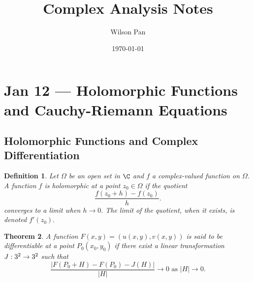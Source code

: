 \documentclass[a4paper]{article}
\title{Complex Analysis Notes}
\author{Wilson Pan}
\date{\today}
\newtheorem{thm}{Theorem}[section]
\newtheorem{defn}[thm]{Definition}
\begin{document}
\maketitle

\tableofcontents
\newpage

\section{Jan 12 --- Holomorphic Functions and Cauchy-Riemann Equations}
\subsection{Holomorphic Functions and Complex Differentiation}
\begin{defn}
    Let $\Omega$ be an open set in $\C$ and $f$ a complex-valued function on $\Omega$. A  function $f$ is holomorphic at a point $z_0\in \Omega$ if the quotient \[
    \frac{f(z_0+h)-f(z_0)}{h}
    .\] 
    converges to a limit when $h\to 0.$ The limit of the quotient, when it exists, is denoted $f'(z_0).$
\end{defn}
\begin{thm}
    A function $F(x,y)=(u(x,y),v(x,y))$ is said to be differentiable at a point $P_0(x_0,y_0)$ if there exist a linear transformation $J:3^2\to 3^2$ such that \[
    \frac{|F(P_0+H)-F(P_0)-J(H)|}{|H|}\to 0 \text{ as } |H|\to 0
    .\] 
\end{thm}
\end{document}
